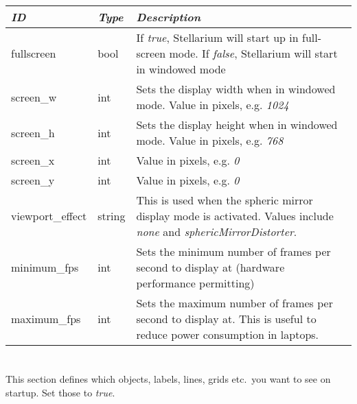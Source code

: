 \section{}\label{section-video}

\begin{longtabu} to \textwidth {l|l|X}
\toprule
\emph{ID} & \emph{Type} & \emph{Description}\tabularnewline
\midrule
fullscreen & bool & If \emph{true}, Stellarium will start
up in full-screen mode. If \emph{false}, Stellarium will start in
windowed mode\tabularnewline
\midrule
screen\_w & int & Sets the display width when in windowed mode. Value in pixels, e.g. \emph{1024}\tabularnewline
\midrule
screen\_h & int & Sets the display height when in windowed mode. Value in pixels, e.g. \emph{768}\tabularnewline
\midrule
screen\_x & int & Value in pixels, e.g. \emph{0}\tabularnewline
\midrule
screen\_y & int & Value in pixels, e.g. \emph{0}\tabularnewline
\midrule
viewport\_effect & string & This is used when the spheric mirror display mode is activated. Values include \emph{none} and \emph{sphericMirrorDistorter}.\tabularnewline
\midrule
minimum\_fps & int & Sets the minimum number of frames per second to display at (hardware performance permitting)\tabularnewline
\midrule
maximum\_fps & int & Sets the maximum number of frames per second to display at. This is useful to reduce power consumption in laptops.\tabularnewline
\bottomrule
\end{longtabu}

\section{}\label{section-viewing}
This section defines which objects, labels, lines, grids etc.\ you want to see on startup. Set those to \emph{true}.

